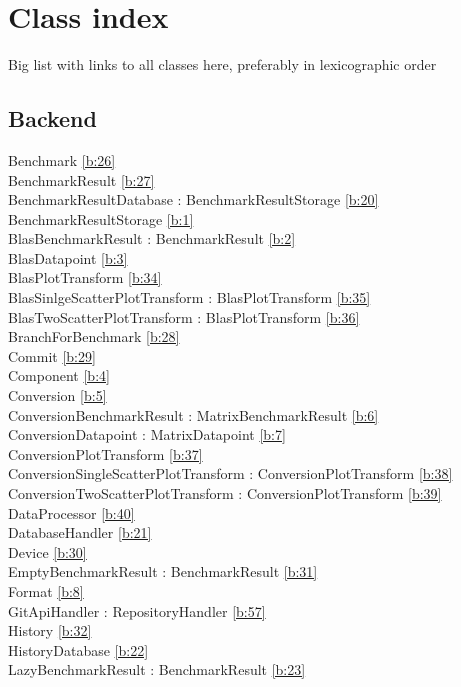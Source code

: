 \section{Class index}
Big list with links to all classes here, preferably in lexicographic order

\subsection{Backend}
Benchmark  \ref{b:26}\\
BenchmarkResult  \ref{b:27}\\
BenchmarkResultDatabase : BenchmarkResultStorage  \ref{b:20}\\
BenchmarkResultStorage \ref{b:1} \\
BlasBenchmarkResult : BenchmarkResult \ref{b:2} \\
BlasDatapoint \ref{b:3} \\
BlasPlotTransform  \ref{b:34}\\
BlasSinlgeScatterPlotTransform : BlasPlotTransform  \ref{b:35}\\
BlasTwoScatterPlotTransform : BlasPlotTransform  \ref{b:36}\\
BranchForBenchmark  \ref{b:28}\\
Commit  \ref{b:29}\\
Component \ref{b:4} \\
Conversion \ref{b:5} \\
ConversionBenchmarkResult : MatrixBenchmarkResult \ref{b:6} \\
ConversionDatapoint : MatrixDatapoint  \ref{b:7}\\
ConversionPlotTransform  \ref{b:37}\\
ConversionSingleScatterPlotTransform : ConversionPlotTransform  \ref{b:38}\\
ConversionTwoScatterPlotTransform : ConversionPlotTransform  \ref{b:39}\\
DataProcessor  \ref{b:40}\\
DatabaseHandler  \ref{b:21}\\
Device  \ref{b:30}\\
EmptyBenchmarkResult : BenchmarkResult  \ref{b:31}\\
Format  \ref{b:8}\\
GitApiHandler : RepositoryHandler  \ref{b:57}\\
History  \ref{b:32}\\
HistoryDatabase  \ref{b:22}\\
LazyBenchmarkResult : BenchmarkResult  \ref{b:23}\\
